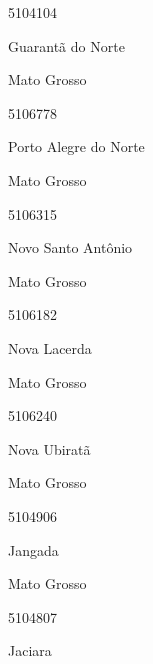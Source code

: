 \documentclass[
  letterpaper,
]{report}
\begin{document}
\n      

5104104

\n      

Guarantã do Norte

\n    

\n    

\n      

Mato Grosso

\n      

5106778

\n      

Porto Alegre do Norte

\n    

\n    

\n      

Mato Grosso

\n      

5106315

\n      

Novo Santo Antônio

\n    

\n    

\n      

Mato Grosso

\n      

5106182

\n      

Nova Lacerda

\n    

\n    

\n      

Mato Grosso

\n      

5106240

\n      

Nova Ubiratã

\n    

\n    

\n      

Mato Grosso

\n      

5104906

\n      

Jangada

\n    

\n    

\n      

Mato Grosso

\n      

5104807

\n      

Jaciara
\end{document}
